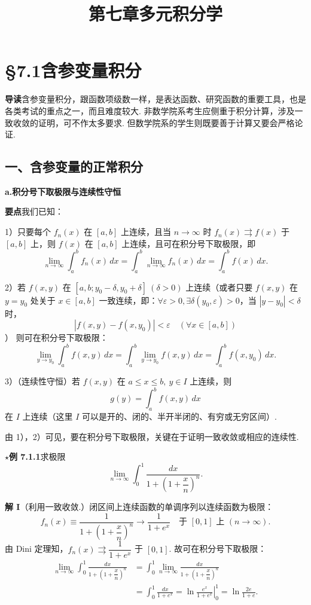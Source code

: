 \documentclass[UTF8,12pt,a4paper,fontset=fandol]{ctexart}
\title{第七章\quad 多元积分学}
\author{}
\date{}
\begin{document}
\maketitle

\section*{§7.1\quad 含参变量积分}

\noindent\textbf{导读}\quad 含参变量积分，跟函数项级数一样，是表达函数、研究函数的重要工具，也是各类考试的重点之一，而且难度较大. 非数学院系考生应侧重于积分计算，涉及一致收敛的证明，可不作太多要求. 但数学院系的学生则既要善于计算又要会严格论证.

\subsection*{一、含参变量的正常积分}

\noindent\textbf{a.\quad 积分号下取极限与连续性守恒}

\noindent\textbf{要点}\quad 我们已知：

1）只要每个 $f_n(x)$ 在 $[a,b]$ 上连续，且当 $n\to\infty$ 时 $f_n(x)\rightrightarrows f(x)$ 于 $[a,b]$ 上，则 $f(x)$ 在 $[a,b]$ 上连续，且可在积分号下取极限，即
\[
\lim_{n\to\infty}\int_a^b f_n(x)\,dx
=\int_a^b \lim_{n\to\infty}f_n(x)\,dx
=\int_a^b f(x)\,dx.
\]

2）若 $f(x,y)$ 在 $[a,b;y_0-\delta,y_0+\delta]\ (\delta>0)$ 上连续（或者只要 $f(x,y)$ 在 $y=y_0$ 处关于 $x\in[a,b]$ 一致连续，即：$\forall\varepsilon>0,\exists\delta(y_0,\varepsilon)>0$，当 $|y-y_0|<\delta$ 时，
\[
|f(x,y)-f(x,y_0)|<\varepsilon\quad(\forall x\in[a,b])
\]
）
则可在积分号下取极限：
\[
\lim_{y\to y_0}\int_a^b f(x,y)\,dx
=\int_a^b \lim_{y\to y_0}f(x,y)\,dx
=\int_a^b f(x,y_0)\,dx.
\]

3）（连续性守恒）若 $f(x,y)$ 在 $a\le x\le b,\ y\in I$ 上连续，则
\[
g(y)=\int_a^b f(x,y)\,dx
\]
在 $I$ 上连续（这里 $I$ 可以是开的、闭的、半开半闭的、有穷或无穷区间）.

由 1），2）可见，要在积分号下取极限，关键在于证明一致收敛或相应的连续性.

\noindent\textbf{$\star$例 7.1.1}\quad 求极限
\[
\lim_{n\to\infty}\int_0^1\frac{dx}{1+\left(1+\dfrac{x}{n}\right)^n}.
\]

\noindent\textbf{解 I}\quad （利用一致收敛.）闭区间上连续函数的单调序列以连续函数为极限：
\[
f_n(x)\equiv \frac1{1+\left(1+\dfrac{x}{n}\right)^n}
\to \frac1{1+e^x}\quad\text{于 }[0,1]\text{ 上 }(n\to\infty).
\]
由 Dini 定理知，$f_n(x)\rightrightarrows\dfrac1{1+e^x}$ 于 $[0,1]$. 故可在积分号下取极限：
\[
\begin{aligned}
\lim_{n\to\infty}\int_0^1\frac{dx}{1+\left(1+\dfrac{x}{n}\right)^n}
&=\int_0^1\lim_{n\to\infty}\frac{dx}{1+\left(1+\dfrac{x}{n}\right)^n}\\
&=\int_0^1\frac{dx}{1+e^x}
=\left.\ln\frac{e^x}{1+e^x}\right|_0^1
=\ln\frac{2e}{1+e}.
\end{aligned}
\]
\end{document}
